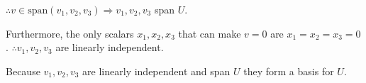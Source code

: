 \documentclass[fleqn]{article}
\begin{document}
\begin{enumerate}[nolistsep]
\begin{enumerate}[nolistsep]
				$\therefore v \in \text{span}(v_1, v_2, v_3) \Rightarrow v_1, v_2, v_3$ span $U$.
									
				Furthermore, the only scalars $x_1, x_2, x_3$ that can make $v = 0$ are $x_1 = x_2 = x_3 = 0$. $\therefore v_1, v_2, v_3$ are linearly independent.
				
				Because $v_1, v_2, v_3$ are linearly independent and span $U$ they form a basis for $U$.
			\end{enumerate}
	\end{enumerate}
	
\end{document}

